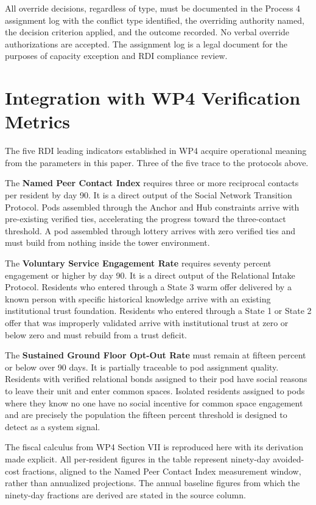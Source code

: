 \documentclass[12pt, letterpaper]{article}
\begin{document}
All override decisions, regardless of type, must be documented in the Process 4 assignment log with the conflict type identified, the overriding authority named, the decision criterion applied, and the outcome recorded. No verbal override authorizations are accepted. The assignment log is a legal document for the purposes of capacity exception and RDI compliance review.

\clearpage
\section{Integration with WP4 Verification Metrics}

The five RDI leading indicators established in WP4 acquire operational meaning from the parameters in this paper. Three of the five trace to the protocols above.

The \textbf{Named Peer Contact Index} requires three or more reciprocal contacts per resident by day 90. It is a direct output of the Social Network Transition Protocol. Pods assembled through the Anchor and Hub constraints arrive with pre-existing verified ties, accelerating the progress toward the three-contact threshold. A pod assembled through lottery arrives with zero verified ties and must build from nothing inside the tower environment.

The \textbf{Voluntary Service Engagement Rate} requires seventy percent engagement or higher by day 90. It is a direct output of the Relational Intake Protocol. Residents who entered through a State 3 warm offer delivered by a known person with specific historical knowledge arrive with an existing institutional trust foundation. Residents who entered through a State 1 or State 2 offer that was improperly validated arrive with institutional trust at zero or below zero and must rebuild from a trust deficit.

The \textbf{Sustained Ground Floor Opt-Out Rate} must remain at fifteen percent or below over 90 days. It is partially traceable to pod assignment quality. Residents with verified relational bonds assigned to their pod have social reasons to leave their unit and enter common spaces. Isolated residents assigned to pods where they know no one have no social incentive for common space engagement and are precisely the population the fifteen percent threshold is designed to detect as a system signal.

The fiscal calculus from WP4 Section VII is reproduced here with its derivation made explicit. All per-resident figures in the table represent ninety-day avoided-cost fractions, aligned to the Named Peer Contact Index measurement window, rather than annualized projections. The annual baseline figures from which the ninety-day fractions are derived are stated in the source column.
\end{document}
